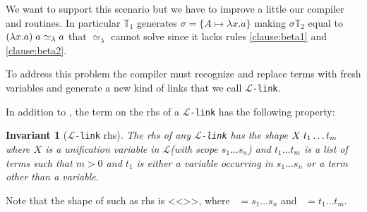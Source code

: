 \documentclass[sigconf,natbib=false,review]{acmart}
\newtheorem{invariant}{Invariant}
\newcommand{\appsep}{\ensuremath{\textcolor{lightgray}{\cdot}}}
\newcommand{\UnifRel}{\ensuremath{\simeq}}
\newcommand{\Ue}{\ensuremath{\UnifRel_\lambda}\xspace}
\newcommand{\llambda}{\ensuremath{\mathcal{L}}\xspace}
\newcommand{\linkMacro}[1]{\ensuremath{#1}\texttt{-link}\xspace}
\newcommand{\linkbeta}{\linkMacro{\llambda}}
\newcommand{\rhs}{rhs\xspace}
\newcommand{\linkStore}{\texorpdfstring{\ensuremath{\mathbb{L}}\xspace}{L}}
\newcommand{\foUnifPb}{\ensuremath{\mathbb{P}}\xspace}
\newcommand{\hoUnifPb}{\ensuremath{\mathbb{T}}\xspace}
\begin{document}

\noindent
We want to support this scenario but we have to improve a little our compiler
and \progress routines.
In particular $\hoUnifPb_1$ generates $\sigma = \{ A
\mapsto \lambda x. a\}$ making $\sigma\hoUnifPb_2$ equal to
$(\lambda x. a) \appsep a \Ue a$ that \Ue{} cannot solve since it
lacks rules \ref{clause:beta1} and \ref{clause:beta2}.

To address this problem the compiler must recognize and replace
\notllambda terms with fresh variables and generate a new kind of links
that we call \linkbeta.

In addition to , the term on the \rhs of a \linkbeta
has the following property:

\newcommand{\rhsBetaHead}{\ensuremath{X_{s_1\dots s_n}}}
\newcommand{\rhsBeta}{\ensuremath{\rhsBetaHead\appsep t_1\dots t_m}\xspace}

\begin{invariant}[\linkbeta \rhs]
  The \rhs of any \linkbeta has the shape $X\appsep t_1\dots t_m$
  where $X$ is a unification variable in \llambda (with scope $s_1\dots s_n$)
  and $t_1\dots t_m$ is a list of terms such that $m>0$ and
  $t_1$ is either a variable occurring in $s_1\dots s_n$ or
  a term other than a variable.
  \label{inv:beta-rhs}
\end{invariant}

\noindent Note that the shape of such as \rhs is
  <<>>, where ~$= s_1\dots s_n$
  and ~$=t_1\dots t_m$.
  


\end{document}
